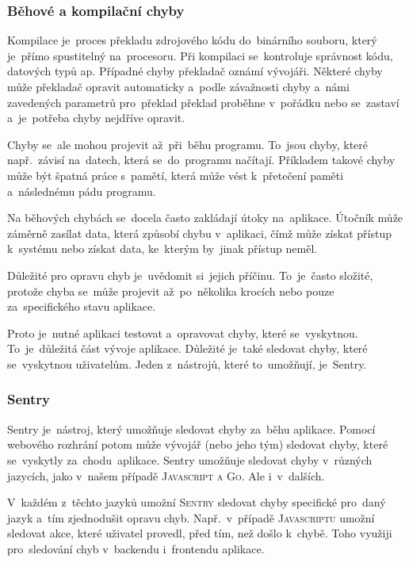 \documentclass[14pt,a4paper]{article}
\begin{document}
            \subsubsection{Běhové a kompilační chyby}
            Kompilace je~proces překladu zdrojového kódu do~binárního souboru, který je~přímo spustitelný na~procesoru.
            Při kompilaci se~kontroluje správnost kódu, datových typů ap. Případné chyby překladač oznámí vývojáři.
            Některé chyby může překladač opravit automaticky a~podle závažnosti chyby a~námi zavedených parametrů pro~překlad
            překlad proběhne v~pořádku nebo se~zastaví a~je~potřeba chyby nejdříve opravit.

            Chyby se~ale mohou projevit až~při~běhu programu. To~jsou chyby, které např.~závisí na~datech, která se~do~programu načítají.
            Příkladem takové chyby může být špatná práce s~pamětí, která může vést k~přetečení paměti a~následnému pádu programu.

            Na běhových chybách se~docela často zakládají útoky na~aplikace. Útočník může záměrně zasílat data, která způsobí chybu v~aplikaci,
            čímž může získat přístup k~systému nebo získat data, ke~kterým by~jinak přístup neměl.

            Důležité pro opravu chyb je~uvědomit si~jejich příčinu. To~je~často složité, protože chyba se~může projevit až~po~několika krocích nebo pouze za~specifického stavu aplikace.

            Proto je~nutné aplikaci testovat a~opravovat chyby, které se~vyskytnou. To~je~důležitá část vývoje aplikace. Důležité je~také sledovat
            chyby, které se~vyskytnou uživatelům. Jeden z~nástrojů, které to~umožňují, je~Sentry.

            \subsubsection{Sentry}
            Sentry je~nástroj, který umožňuje sledovat chyby za~běhu aplikace.
            Pomocí webového rozhrání potom může vývojář (nebo jeho tým) sledovat chyby, které se~vyskytly za~chodu~aplikace.
            Sentry umožňuje sledovat chyby v~různých jazycích, jako v~našem případě \textsc{Javascript a Go}. Ale i~v~dalších.


            V~každém z~těchto jazyků umožní \textsc{Sentry} sledovat chyby specifické pro~daný jazyk a~tím zjednodušit opravu chyb.
            Např.~v~případě \textsc{Javascriptu} umožní sledovat akce, které uživatel provedl, před tím, než došlo k~chybě. 
            Toho využiji pro~sledování chyb v~backendu i~frontendu aplikace.
\end{document}
